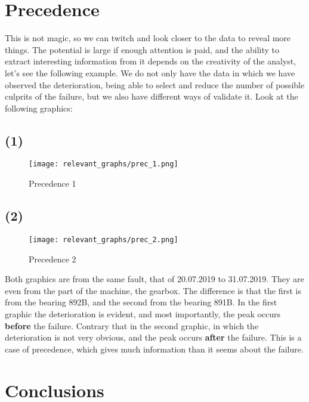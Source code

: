 \documentclass[
]{article}
\begin{document}
\hypertarget{precedence}{%
\section{Precedence}\label{precedence}}

This is not magic, so we can twitch and look closer to the data to
reveal more things. The potential is large if enough attention is paid,
and the ability to extract interesting information from it depends on
the creativity of the analyst, let's see the following example. We do
not only have the data in which we have observed the deterioration,
being able to select and reduce the number of possible culprits of the
failure, but we also have different ways of validate it. Look at the
following graphics:

\hypertarget{section}{%
\subsection{(1)}\label{section}}

\begin{figure}
\centering
\texttt{[image: relevant\_graphs/prec\_1.png]}
\caption{Precedence 1}
\end{figure}

\hypertarget{section-1}{%
\subsection{(2)}\label{section-1}}

\begin{figure}
\centering
\texttt{[image: relevant\_graphs/prec\_2.png]}
\caption{Precedence 2}
\end{figure}

Both graphics are from the same fault, that of 20.07.2019 to 31.07.2019.
They are even from the part of the machine, the gearbox. The difference
is that the first is from the bearing 892B, and the second from the
bearing 891B. In the first graphic the deterioration is evident, and
most importantly, the peak occurs \textbf{before} the failure. Contrary
that in the second graphic, in which the deterioration is not very
obvious, and the peak occurs \textbf{after} the failure. This is a case
of precedence, which gives much information than it seems about the
failure.

\hypertarget{conclusions}{%
\section{Conclusions}\label{conclusions}}
\end{document}
